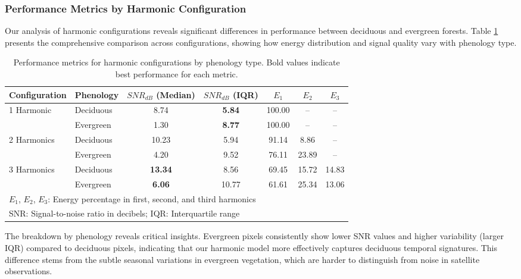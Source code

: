 \documentclass[utf8]{FrontiersinHarvard}
\begin{document}
\subsubsection{Performance Metrics by Harmonic Configuration}

Our analysis of harmonic configurations reveals significant differences in performance between deciduous and evergreen forests. Table \ref{tab:harmonic_performance} presents the comprehensive comparison across configurations, showing how energy distribution and signal quality vary with phenology type.

\begin{table}[H]
    \centering
    \begin{tabular}{llccccc}
        \hline
        Configuration & Phenology & $SNR_{dB}$ (Median) & $SNR_{dB}$ (IQR) & $E_1$ & $E_2$ & $E_3$ \\
        \hline
        \multirow{2}{*}{1 Harmonic} 
            & Deciduous & 8.74 & \textbf{5.84} & 100.00 & -- & -- \\
            & Evergreen & 1.30 & \textbf{8.77} & 100.00 & -- & -- \\
        \hline
        \multirow{2}{*}{2 Harmonics} 
            & Deciduous & 10.23 & 5.94 & 91.14 & 8.86 & -- \\
            & Evergreen & 4.20 & 9.52 & 76.11 & 23.89 & -- \\
        \hline
        \multirow{2}{*}{3 Harmonics} 
            & Deciduous & \textbf{13.34} & 8.56 & 69.45 & 15.72 & 14.83 \\
            & Evergreen & \textbf{6.06} & 10.77 & 61.61 & 25.34 & 13.06 \\
        \hline
        \multicolumn{7}{l}{\small $E_1$, $E_2$, $E_3$: Energy percentage in first, second, and third harmonics} \\
        \multicolumn{7}{l}{\small SNR: Signal-to-noise ratio in decibels; IQR: Interquartile range} \\
    \end{tabular}
    \caption{Performance metrics for harmonic configurations by phenology type. Bold values indicate best performance for each metric.}
    \label{tab:harmonic_performance}
\end{table}

The breakdown by phenology reveals critical insights. Evergreen pixels consistently show lower SNR values and higher variability (larger IQR) compared to deciduous pixels, indicating that our harmonic model more effectively captures deciduous temporal signatures. This difference stems from the subtle seasonal variations in evergreen vegetation, which are harder to distinguish from noise in satellite observations.
\end{document}
